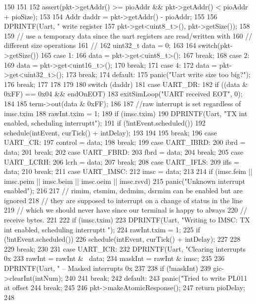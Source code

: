 \begin{DoxyCode}
150 {
151 
152     assert(pkt->getAddr() >= pioAddr && pkt->getAddr() < pioAddr + pioSize);
153 
154     Addr daddr = pkt->getAddr() - pioAddr;
155 
156     DPRINTF(Uart, " write register %
157             pkt->get<uint8_t>(), pkt->getSize());
158 
159     // use a temporary data since the uart registers are read/written with
160     // different size operations
161     //
162     uint32_t data = 0;
163 
164     switch(pkt->getSize()) {
165       case 1:
166         data = pkt->get<uint8_t>();
167         break;
168       case 2:
169         data = pkt->get<uint16_t>();
170         break;
171       case 4:
172         data = pkt->get<uint32_t>();
173         break;
174       default:
175         panic("Uart write size too big?\n");
176         break;
177     }
178 
179 
180     switch (daddr) {
181         case UART_DR:
182           if ((data & 0xFF) == 0x04 && endOnEOT)
183             exitSimLoop("UART received EOT", 0);
184 
185         term->out(data & 0xFF);
186 
187         //raw interrupt is set regardless of imsc.txim
188         rawInt.txim = 1;
189         if (imsc.txim) {
190             DPRINTF(Uart, "TX int enabled, scheduling interruptt\n");
191             if (!intEvent.scheduled())
192                 schedule(intEvent, curTick() + intDelay);
193         }
194 
195         break;
196       case UART_CR:
197         control = data;
198         break;
199       case UART_IBRD:
200         ibrd = data;
201         break;
202       case UART_FBRD:
203         fbrd = data;
204         break;
205       case UART_LCRH:
206         lcrh = data;
207         break;
208       case UART_IFLS:
209         ifls = data;
210         break;
211       case UART_IMSC:
212         imsc = data;
213 
214         if (imsc.feim || imsc.peim || imsc.beim || imsc.oeim || imsc.rsvd)
215             panic("Unknown interrupt enabled\n");
216 
217         // rimim, ctsmim, dcdmim, dsrmim can be enabled but are ignored
218         // they are supposed to interrupt on a change of status in the line
219         // which we should never have since our terminal is happy to always
220         // receive bytes.
221 
222         if (imsc.txim) {
223             DPRINTF(Uart, "Writing to IMSC: TX int enabled, scheduling interruptt
      \n");
224             rawInt.txim = 1;
225             if (!intEvent.scheduled())
226                 schedule(intEvent, curTick() + intDelay);
227         }
228 
229         break;
230 
231       case UART_ICR:
232         DPRINTF(Uart, "Clearing interrupts 0x%
233         rawInt = rawInt & ~data;
234         maskInt = rawInt & imsc;
235 
236         DPRINTF(Uart, " -- Masked interrupts 0x%
237 
238         if (!maskInt)
239             gic->clearInt(intNum);
240 
241         break;
242       default:
243         panic("Tried to write PL011 at offset %
244         break;
245     }
246     pkt->makeAtomicResponse();
247     return pioDelay;
248 }
\end{DoxyCode}


